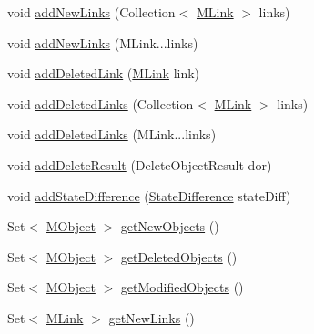 \begin{DoxyCompactItemize}
void \hyperlink{classorg_1_1tzi_1_1use_1_1util_1_1soil_1_1_state_difference_ab5a6686a7bf71e179ec02bdab45ee046}{add\-New\-Links} (Collection$<$ \hyperlink{interfaceorg_1_1tzi_1_1use_1_1uml_1_1sys_1_1_m_link}{M\-Link} $>$ links)
\item 
void \hyperlink{classorg_1_1tzi_1_1use_1_1util_1_1soil_1_1_state_difference_a6fc9850fe3e949883e46919e4edf9482}{add\-New\-Links} (M\-Link...\-links)
\item 
void \hyperlink{classorg_1_1tzi_1_1use_1_1util_1_1soil_1_1_state_difference_a1112eb17bff39641b1058da753de7d34}{add\-Deleted\-Link} (\hyperlink{interfaceorg_1_1tzi_1_1use_1_1uml_1_1sys_1_1_m_link}{M\-Link} link)
\item 
void \hyperlink{classorg_1_1tzi_1_1use_1_1util_1_1soil_1_1_state_difference_afe9be459f5b636f873239f25a392add5}{add\-Deleted\-Links} (Collection$<$ \hyperlink{interfaceorg_1_1tzi_1_1use_1_1uml_1_1sys_1_1_m_link}{M\-Link} $>$ links)
\item 
void \hyperlink{classorg_1_1tzi_1_1use_1_1util_1_1soil_1_1_state_difference_a1fad3466f53a5b79354f0cd61c5fc5e6}{add\-Deleted\-Links} (M\-Link...\-links)
\item 
void \hyperlink{classorg_1_1tzi_1_1use_1_1util_1_1soil_1_1_state_difference_a1b1b91f07d607adf10cf40e0a831c6bc}{add\-Delete\-Result} (Delete\-Object\-Result dor)
\item 
void \hyperlink{classorg_1_1tzi_1_1use_1_1util_1_1soil_1_1_state_difference_af6397737c15b65c2a7cd5ae5bdc4d194}{add\-State\-Difference} (\hyperlink{classorg_1_1tzi_1_1use_1_1util_1_1soil_1_1_state_difference}{State\-Difference} state\-Diff)
\item 
Set$<$ \hyperlink{interfaceorg_1_1tzi_1_1use_1_1uml_1_1sys_1_1_m_object}{M\-Object} $>$ \hyperlink{classorg_1_1tzi_1_1use_1_1util_1_1soil_1_1_state_difference_ae2a5c811c2f15fe833d175eae757f2d3}{get\-New\-Objects} ()
\item 
Set$<$ \hyperlink{interfaceorg_1_1tzi_1_1use_1_1uml_1_1sys_1_1_m_object}{M\-Object} $>$ \hyperlink{classorg_1_1tzi_1_1use_1_1util_1_1soil_1_1_state_difference_a383d82210a9254b16d76e106b63da3da}{get\-Deleted\-Objects} ()
\item 
Set$<$ \hyperlink{interfaceorg_1_1tzi_1_1use_1_1uml_1_1sys_1_1_m_object}{M\-Object} $>$ \hyperlink{classorg_1_1tzi_1_1use_1_1util_1_1soil_1_1_state_difference_abb6c0c501f1600d056174fd98f821ab8}{get\-Modified\-Objects} ()
\item 
Set$<$ \hyperlink{interfaceorg_1_1tzi_1_1use_1_1uml_1_1sys_1_1_m_link}{M\-Link} $>$ \hyperlink{classorg_1_1tzi_1_1use_1_1util_1_1soil_1_1_state_difference_ac8248c411a5e97ac9e4d3f1d9b24a01a}{get\-New\-Links} ()

\end{DoxyCompactItemize}
